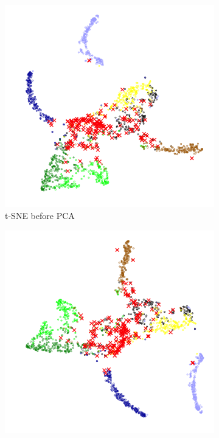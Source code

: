 \documentclass[10pt]{article}
\begin{document}
\begin{figure}[H]
    \centering
    \begin{subfigure}{.49\textwidth}
        \centering
        \includegraphics[width=\textwidth]{t-SNE_wo_cl2_before_PCA}
        \caption{\gls{t-SNE} before \gls{PCA}}
    \end{subfigure}
    \begin{subfigure}{.5\textwidth}
        \centering
        \includegraphics[width=\textwidth]{t-SNE_wo_cl2_after_PCA}

\end{subfigure}
\end{figure}
\end{document}
